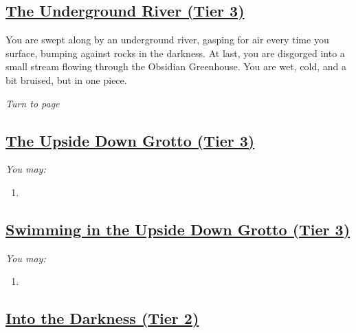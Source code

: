 \documentclass[sheet]{GL2020}
\begin{document}
\clearpage

\begin{center}\section*{\underline{The Underground River (Tier 3)}}\end{center}
\label{UndergroundRiver}

You are swept along by an underground river, gasping for air every time you surface, bumping against rocks in the darkness. At last, you are disgorged into a small stream flowing through the Obsidian Greenhouse. You are wet, cold, and a bit bruised, but in one piece.

\emph{Turn to page \pageref{ObsidianGreenhouse}}

\clearpage

\begin{center}\section*{\underline{The Upside Down Grotto (Tier 3)}}\end{center}
\label{UpsideDownGrotto}

\begingroup
\itshape
You may:
\begin{enumerate}[A]
  \item 
\end{enumerate}
\endgroup

\clearpage


\begin{center}\section*{\underline{Swimming in the Upside Down Grotto (Tier 3)}}\end{center}
\label{SwiminGrotto}

\begingroup
\itshape
You may:
\begin{enumerate}[A]
  \item 
\end{enumerate}
\endgroup

\clearpage

\begin{center}\section*{\underline{Into the Darkness (Tier 2)}}\end{center}
\label{IntotheDarkness}
\end{document}
